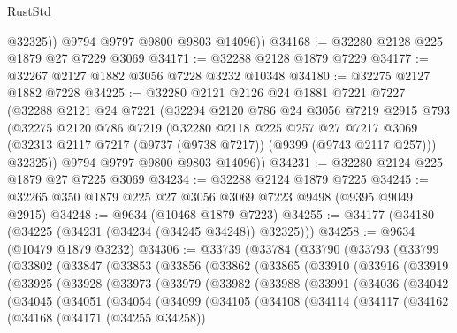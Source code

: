 \begin{lexlean}{RustStd}
\begin{coremodule}
            @32325))
        @9794
        @9797
        @9800
        @9803
        @14096))
@34168 := @32280 @2128 @225 @1879 @27 @7229 @3069
@34171 := @32288 @2128 @1879 @7229
@34177 := @32267 @2127 @1882 @3056 @7228 @3232 @10348
@34180 := @32275 @2127 @1882 @7228
@34225 := @32280
    @2121
    @2126
    @24
    @1881
    @7221
    @7227
    (@32288
      @2121
      @24
      @7221
      (@32294
        @2120
        @786
        @24
        @3056
        @7219
        @2915
        @793
        (@32275
          @2120
          @786
          @7219
          (@32280
            @2118
            @225
            @257
            @27
            @7217
            @3069
            (@32313 @2117 @7217 (@9737 (@9738 @7217)) (@9399 (@9743 @2117 @257)))
            @32325))
        @9794
        @9797
        @9800
        @9803
        @14096))
@34231 := @32280 @2124 @225 @1879 @27 @7225 @3069
@34234 := @32288 @2124 @1879 @7225
@34245 := @32265 @350 @1879 @225 @27 @3056 @3069 @7223 @9498 (@9395 @9049 @2915)
@34248 := @9634 (@10468 @1879 @7223)
@34255 := @34177 (@34180 (@34225 (@34231 (@34234 (@34245 @34248)) @32325)))
@34258 := @9634 (@10479 @1879 @3232)
@34306 := @33739
    (@33784
      (@33790
        (@33793
          (@33799
            (@33802
              (@33847
                (@33853
                  (@33856
                    (@33862
                      (@33865
                        (@33910
                          (@33916
                            (@33919
                              (@33925
                                (@33928
                                  (@33973
                                    (@33979
                                      (@33982
                                        (@33988
                                          (@33991
                                            (@34036
                                              (@34042
                                                (@34045
                                                  (@34051
                                                    (@34054
                                                      (@34099
                                                        (@34105
                                                          (@34108
                                                            (@34114
                                                              (@34117
                                                                (@34162
                                                                  (@34168
                                                                    (@34171 (@34255 @34258))

\end{coremodule}
\end{lexlean}

